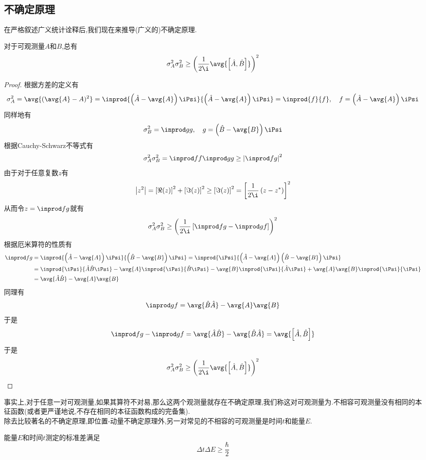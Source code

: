 \documentclass{ctexart}
\begin{document}
\subsection{不确定原理}
在严格叙述广义统计诠释后,我们现在来推导(广义的)不确定原理.
\begin{theorem}[不确定原理]
    对于可观测量$A$和$B$,总有
    \[\sigma_A^2\sigma_B^2\geq\left(\dfrac{1}{2\i}\avg{\left[\hat{A},\hat{B}\right]}\right)^2\]
\end{theorem}
\begin{proof}
    根据方差的定义有
    \[\sigma_A^2=\avg{(\avg{A}-A)^2}=\inprod{\left(\hat{A}-\avg{A}\right)\iPsi}{\left(\hat{A}-\avg{A}\right)\iPsi}=\inprod{f}{f},\quad f=\left(\hat{A}-\avg{A}\right)\iPsi\]
    同样地有
    \[\sigma_B^2=\inprod gg,\quad g=\left(\hat{B}-\avg{B}\right)\iPsi\]
    根据Cauchy-Schwarz不等式有
    \[\sigma_A^2\sigma_B^2=\inprod ff\inprod gg\geq\left|\inprod fg\right|^2\]
    由于对于任意复数$z$有
    \[\left|z^2\right|=\left[\Re(z)\right]^2+\left[\Im(z)\right]^2\geq\left[\Im(z)\right]^2=\left[\dfrac{1}{2\i}\left(z-z^\ast\right)\right]^2\]
    从而令$z=\inprod fg$就有
    \[\sigma_A^2\sigma_B^2\geq\left(\dfrac{1}{2\i}\left[\inprod fg-\inprod gf\right]\right)^2\]
    根据厄米算符的性质有
    \[\begin{aligned}
        \inprod fg
        &=\inprod{\left(\hat{A}-\avg{A}\right)\iPsi}{\left(\hat{B}-\avg{B}\right)\iPsi}=\inprod{\iPsi}{\left(\hat{A}-\avg{A}\right)\left(\hat{B}-\avg{B}\right)\iPsi}\\
        &=\inprod{\iPsi}{\hat{A}\hat{B}\iPsi}-\avg{A}\inprod{\iPsi}{\hat{B}\iPsi}-\avg{B}\inprod{\iPsi}{\hat{A}\iPsi}+\avg{A}\avg{B}\inprod{\iPsi}{\iPsi}\\
        &=\avg{\hat{A}\hat{B}}-\avg{A}\avg{B}
    \end{aligned}\]
    同理有
    \[\inprod gf=\avg{\hat{B}\hat{A}}-\avg{A}\avg{B}\]
    于是
    \[\inprod fg-\inprod gf=\avg{\hat{A}\hat{B}}-\avg{\hat{B}\hat{A}}=\avg{\left[\hat{A},\hat{B}\right]}\]
    于是
    \[\sigma_A^2\sigma_B^2\geq\left(\dfrac{1}{2\i}\avg{\left[\hat{A},\hat{B}\right]}\right)^2\]
\end{proof}
事实上,对于任意一对可观测量,如果其算符不对易,那么这两个观测量就存在不确定原理,我们称这对可观测量为.不相容可观测量没有相同的本征函数(或者更严谨地说,不存在相同的本征函数构成的完备集).\\
\indent 除去比较著名的不确定原理,即位置-动量不确定原理外,另一对常见的不相容的可观测量是时间$t$和能量$E$.
\begin{theorem}[能量-时间不确定原理]
    能量$E$和时间$t$测定的标准差满足
    \[\Delta t\Delta E\geq\dfrac{\hbar}{2}\]
\end{theorem}
\end{document}
